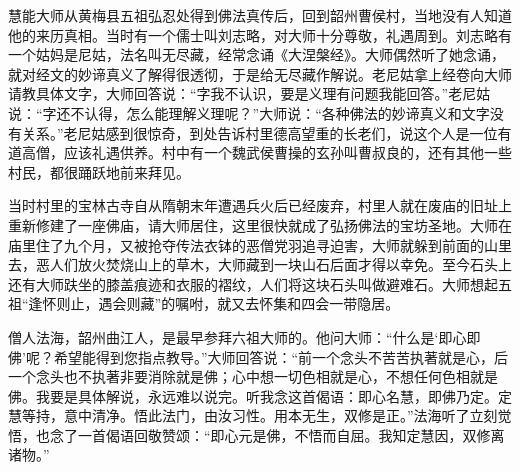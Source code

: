 \documentclass[12pt,twoside,openany]{book}
\newcommand{\kai}[1]{{\CJKfamily{kai}#1}}
\begin{document}
\kai{慧能大师从黄梅县五祖弘忍处得到佛法真传后，回到韶州曹侯村，当地没有人知道他的来历真相。当时有一个儒士叫刘志略，对大师十分尊敬，礼遇周到。刘志略有一个姑妈是尼姑，法名叫无尽藏，经常念诵《大涅槃经》。大师偶然听了她念诵，就对经文的妙谛真义了解得很透彻，于是给无尽藏作解说。老尼姑拿上经卷向大师请教具体文字，大师回答说：“字我不认识，要是义理有问题我能回答。”老尼姑说：“字还不认得，怎么能理解义理呢？”大师说：“各种佛法的妙谛真义和文字没有关系。”老尼姑感到很惊奇，到处告诉村里德高望重的长老们，说这个人是一位有道高僧，应该礼遇供养。村中有一个魏武侯曹操的玄孙叫曹叔良的，还有其他一些村民，都很踊跃地前来拜见。
	
当时村里的宝林古寺自从隋朝末年遭遇兵火后已经废弃，村里人就在废庙的旧址上重新修建了一座佛庙，请大师居住，这里很快就成了弘扬佛法的宝坊圣地。大师在庙里住了九个月，又被抢夺传法衣钵的恶僧党羽追寻迫害，大师就躲到前面的山里去，恶人们放火焚烧山上的草木，大师藏到一块山石后面才得以幸免。至今石头上还有大师趺坐的膝盖痕迹和衣服的褶纹，人们将这块石头叫做避难石。大师想起五祖“逢怀则止，遇会则藏”的嘱咐，就又去怀集和四会一带隐居。

僧人法海，韶州曲江人，是最早参拜六祖大师的。他问大师：“什么是‘即心即佛’呢？希望能得到您指点教导。”大师回答说：“前一个念头不苦苦执著就是心，后一个念头也不执著非要消除就是佛；心中想一切色相就是心，不想任何色相就是佛。我要是具体解说，永远难以说完。听我念这首偈语：即心名慧，即佛乃定。定慧等持，意中清净。悟此法门，由汝习性。用本无生，双修是正。”法海听了立刻觉悟，也念了一首偈语回敬赞颂：“即心元是佛，不悟而自屈。我知定慧因，双修离诸物。”}
\end{document}
